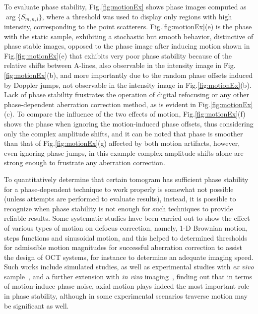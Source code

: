 To evaluate phase stability, Fig.\ref{fig:motionEx} shows phase images computed as $\arg\{S_{m,n,l}\}$, where a threshold was used to display only regions with high intensity, corresponding to the point scatterers. Fig.\ref{fig:motionEx}(e) is the phase with the static sample, exhibiting a stochastic but smooth behavior, distinctive of phase stable images, opposed to the phase image after inducing motion shown in Fig.\ref{fig:motionEx}(e) that exhibits very poor phase stability because of the relative shifts between A-lines, also observable in the intensity image in Fig.\ref{fig:motionEx}(b), and more importantly due to the random phase offsets induced by Doppler jumps, not observable in the intensity image in Fig.\ref{fig:motionEx}(b). Lack of phase stability frustrates the operation of digital refocusing or any other phase-dependent aberration correction method, as is evident in Fig.\ref{fig:motionEx}(c). To compare the influence of the two effects of motion, Fig.\ref{fig:motionEx}(f) shows the phase when ignoring the motion-induced phase offsets, thus considering only the complex amplitude shifts, and it can be noted that phase is smoother than that of Fig.\ref{fig:motionEx}(g) affected by both motion artifacts, however, even ignoring phase jumps, in this example complex amplitude shifts alone are strong enough to frustrate any aberration correction.

To quantitatively determine that certain tomogram has sufficient phase stability for a phase-dependent technique to work properly is somewhat not possible (unless attempts are performed to evaluate results), instead, it is possible to recognize when phase stability is not enough for such techniques to provide reliable results. Some systematic studies have been carried out to show the effect of various types of motion on defocus correction, namely, 1-D Brownian motion, steps functions and sinusoidal motion, and this helped to determined thresholds for admissible motion magnitudes for successful aberration correction to assist the design of OCT systems, for instance to determine an adequate imaging speed. Such works include simulated studies, as well as experimental studies with \textit{ex vivo} sample~\cite{Shemonski2014_Stability}, and a further extension with \textit{in vivo} imaging~\cite{Shemonski2014_Stability-1}, finding out that in terms of motion-induce phase noise, axial motion plays indeed the most important role in phase stability, although in some experimental scenarios traverse motion may be significant as well.

